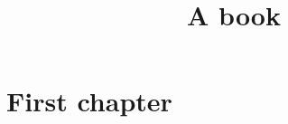 \documentclass{book}
\title{A book}
\begin{document}
	\maketitle
	
	\tableofcontents
	
	\chapter{First chapter}
	
	
	
\end{document}
